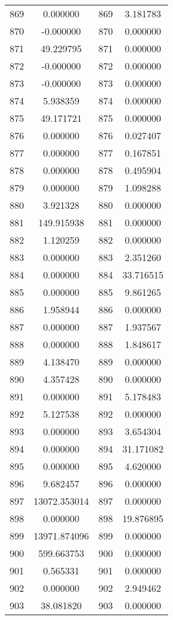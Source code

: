\documentclass[12pt]{article}
\begin{document}
\begin{longtable}{@{}cccc@{}}
869 & 0.000000 & 869 & 3.181783 \\
870 & -0.000000 & 870 & 0.000000 \\
871 & 49.229795 & 871 & 0.000000 \\
872 & -0.000000 & 872 & 0.000000 \\
873 & -0.000000 & 873 & 0.000000 \\
874 & 5.938359 & 874 & 0.000000 \\
875 & 49.171721 & 875 & 0.000000 \\
876 & 0.000000 & 876 & 0.027407 \\
877 & 0.000000 & 877 & 0.167851 \\
878 & 0.000000 & 878 & 0.495904 \\
879 & 0.000000 & 879 & 1.098288 \\
880 & 3.921328 & 880 & 0.000000 \\
881 & 149.915938 & 881 & 0.000000 \\
882 & 1.120259 & 882 & 0.000000 \\
883 & 0.000000 & 883 & 2.351260 \\
884 & 0.000000 & 884 & 33.716515 \\
885 & 0.000000 & 885 & 9.861265 \\
886 & 1.958944 & 886 & 0.000000 \\
887 & 0.000000 & 887 & 1.937567 \\
888 & 0.000000 & 888 & 1.848617 \\
889 & 4.138470 & 889 & 0.000000 \\
890 & 4.357428 & 890 & 0.000000 \\
891 & 0.000000 & 891 & 5.178483 \\
892 & 5.127538 & 892 & 0.000000 \\
893 & 0.000000 & 893 & 3.654304 \\
894 & 0.000000 & 894 & 31.171082 \\
895 & 0.000000 & 895 & 4.620000 \\
896 & 9.682457 & 896 & 0.000000 \\
897 & 13072.353014 & 897 & 0.000000 \\
898 & 0.000000 & 898 & 19.876895 \\
899 & 13971.874096 & 899 & 0.000000 \\
900 & 599.663753 & 900 & 0.000000 \\
901 & 0.565331 & 901 & 0.000000 \\
902 & 0.000000 & 902 & 2.949462 \\
903 & 38.081820 & 903 & 0.000000 \\

\end{longtable}
\end{document}
